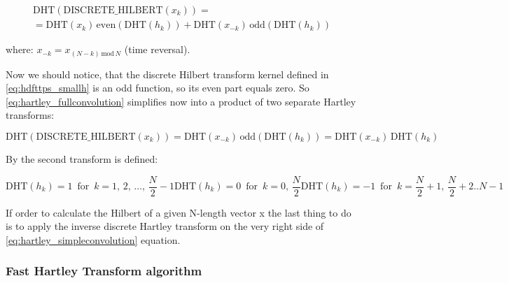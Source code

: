 \documentclass[12pt,twoside,a4paper]{article}
\numberwithin{equation}{subsection}
\numberwithin{figure}{subsection}
\begin{document}
\begin{multline} \label{eq:hartley_fullconvolution}
         \mathrm{DHT}(\mathrm{DISCRETE\_HILBERT}({x_{k}}))  
  = \\ = \mathrm{DHT}({x_{k}})\,\mathrm{even}(\mathrm{DHT}({h_{k}})) 
       + \mathrm{DHT}({x_{- k}})\,\mathrm{odd}(\mathrm{DHT}({h_{k}}))
\end{multline} 

where: $x_{ - k}=x_{(N - k)\,\mathrm{mod}\,N}$ (time reversal).

Now we should notice, that the discrete Hilbert transform kernel defined in \ref{eq:hdfttps_smallh} is an odd function, so its even
part equals zero. So \ref{eq:hartley_fullconvolution} simplifies now into a product of two separate Hartley transforms:

\begin{equation} \label{eq:hartley_simpleconvolution}
  \mathrm{DHT}(\mathrm{DISCRETE\_HILBERT}({x_{k}}))=\mathrm{DHT}({x_{ - k}})\,\mathrm{odd}(\mathrm{DHT}({h_{k}})) =
  \mathrm{DHT}({x_{- k}})\,\mathrm{DHT}({h_{k}})
\end{equation}

By \cite{chang_computation} the second transform is defined:

\begin{subequations} \label{eq:hartley_strans} 
  \begin{equation}   \label{eq:hstrans_fhalf}
    \mathrm{DHT}({h_{k}})=1\, \mbox{ for }\, k=1, \,2,\,\ldots,\,\frac {N}{2} - 1
  \end{equation}
  \begin{equation}   \label{eq:hstrans_middle}
    \mathrm{DHT}({h_{k}})=0\, \mbox{ for }\, k=0, \,\frac {N}{2}
  \end{equation}
  \begin{equation}   \label{eq:hstrans_shalf}
    \mathrm{DHT}({h_{k}})= - 1\, \mbox{ for }\, k=\frac {N}{2} + 1, \,\frac {N}{2} + 2 .. N - 1
  \end{equation}
\end{subequations}

If order to calculate the Hilbert of a given N-length vector x the last thing to do is to apply the inverse discrete Hartley
transform on the very right side of \ref{eq:hartley_simpleconvolution} equation.

\subsubsection*{Fast Hartley Transform algorithm}
\end{document}
